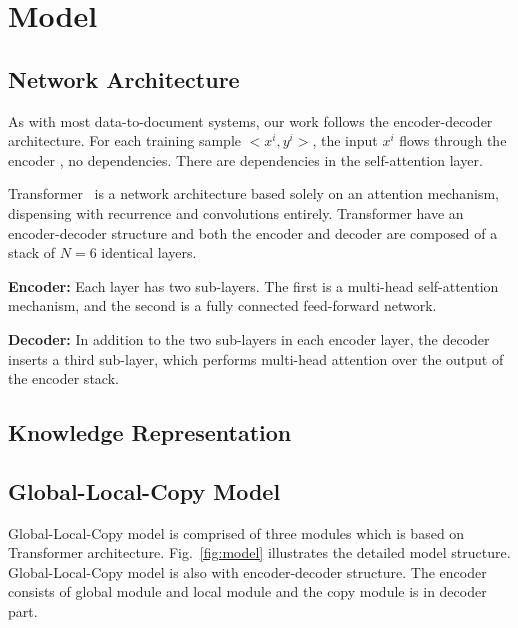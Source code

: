 \documentclass[sigconf]{acmart}
\begin{document}

\section{Model}\label{sec:model}

\subsection{Network Architecture}
As with most data-to-document systems, our work follows the encoder-decoder architecture. For each training sample $<x^i,y^i>$, the input $x^i$ flows through the encoder , no dependencies. There are dependencies in the self-attention layer.

Transformer~\cite{vaswani2017attention} is a network architecture based solely on an attention mechanism, dispensing with recurrence and convolutions entirely. Transformer have an encoder-decoder structure and both the encoder and decoder are composed of a stack of $N = 6$ identical layers.

\textbf{Encoder:} Each layer has two sub-layers. The first is a multi-head self-attention mechanism, and the second is a fully connected feed-forward network.

\textbf{Decoder:} In addition to the two sub-layers in each encoder layer, the decoder inserts a third sub-layer, which performs multi-head attention over the output of the encoder stack. 


\subsection{Knowledge Representation}

\subsection{Global-Local-Copy Model}
Global-Local-Copy model is comprised of three modules which is based on Transformer architecture. Fig.~\ref{fig:model} illustrates the detailed model structure. Global-Local-Copy model is also with encoder-decoder structure. The encoder consists of global module and local module and the copy module is in decoder part. 
\end{document}
